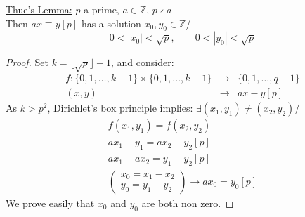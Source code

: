 \documentclass{report}
\begin{document}
\underline{Thue's Lemma:} $p$ a prime, $a\in \mathbb{Z}$, $p\nmid a$\\
Then $ax\equiv y [p]$ has a solution $x_0,y_0 \in \mathbb{Z}$/ 
																		\[0<|x_0|<\sqrt{p},\qquad 0<|y_0|<\sqrt{p}\]
\begin{proof} Set $k=\lfloor\sqrt{p} \rfloor +1$, and consider:
																		\[\begin{array}{rcl}
																			f:\{0,1,\dots,k-1\} \times \{0,1,\dots,k-1\} &\longrightarrow& \{0,1,\dots,q-1\}\\
																			(x,y)&\longrightarrow& ax-y[p]
																			\end{array}\]
							As $k>p^2$, Dirichlet's box principle implies: $\exists (x_1,y_1)\neq(x_2,y_2)$/
																														\[\begin{array}{lcl}
																														f(x_1,y_1)=f(x_2,y_2)\\
																														ax_1-y_1=ax_2-y_2[p]\\
																														ax_1-ax_2=y_1-y_2[p]\\
																																		\left (
																																		\begin{array}{lcl}
																																		x_0=x_1-x_2\\
																																		y_0=y_1-y_2
																																		\end{array}
																																		\right )
																																		\rightarrow ax_0=y_0[p]
																														\end{array}\]
We prove easily that $x_0$ and $y_0$ are both non zero.
\end{proof}
\end{document}
